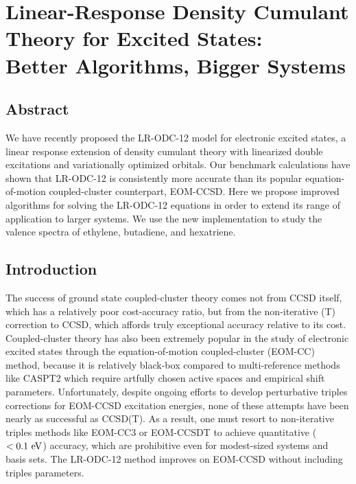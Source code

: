 \chapter[%
    Linear-Response Density Cumulant Theory for Excited States:\\
	Better Algorithms, Bigger Systems
]{%
    Linear-Response Density Cumulant Theory for Excited States:\\
	Better Algorithms, Bigger Systems
}
\label{ch:davidson}


\section{Abstract}

We have recently proposed the LR-ODC-12 model for electronic excited states, a
linear response extension of density cumulant theory with linearized double
excitations and variationally optimized orbitals.
Our benchmark calculations have shown that LR-ODC-12 is consistently more
accurate than its popular equation-of-motion coupled-cluster counterpart,
EOM-CCSD\@.
Here we propose improved algorithms for solving the LR-ODC-12 equations in order
to extend its range of application to larger systems.
We use the new implementation to study the valence spectra of ethylene,
butadiene, and hexatriene.


\section{Introduction}

The success of ground state coupled-cluster theory comes not from CCSD
itself, which has a relatively poor cost-accuracy ratio, but from the
non-iterative (T) correction to CCSD, which affords truly exceptional
accuracy relative to its cost.\cite{Stanton:1997p130}
Coupled-cluster theory has also been extremely popular in the study of
electronic excited states through the equation-of-motion coupled-cluster
(EOM-CC) method,\cite{Krylov:2008p433} because it is relatively
black-box compared to multi-reference methods like
CASPT2\cite{Andersson:1992p1218} which require artfully chosen active
spaces and empirical shift parameters.\cite{Zobel:2017p1482}
Unfortunately, despite ongoing efforts to develop perturbative triples
corrections for EOM-CCSD excitation energies, none of these attempts
have been nearly as successful as CCSD(T).\cite{Matthews:2016p124102}
As a result, one must resort to non-iterative triples methods like
EOM-CC3\cite{Koch:1998p1808} or EOM-CCSDT\cite{Hirata:2000p255} to
achieve quantitative (\(<0.1~\mathrm{eV}\)) accuracy, which are prohibitive even
for modest-sized systems and basis sets.
The LR-ODC-12 method improves on EOM-CCSD without including triples
parameters.


